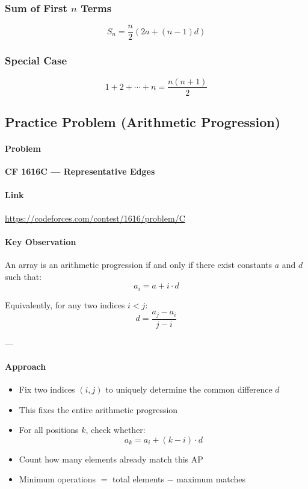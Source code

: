 \documentclass[11pt]{article}
\begin{document}
\subsubsection{Sum of First $n$ Terms}
\[
S_n = \frac{n}{2} (2a + (n-1)d)
\]

\subsubsection{Special Case}
\[
1 + 2 + \cdots + n = \frac{n(n+1)}{2}
\]

\subsection{Practice Problem (Arithmetic Progression)}

\paragraph{Problem}
\textbf{CF 1616C — Representative Edges}

\paragraph{Link}
\url{https://codeforces.com/contest/1616/problem/C}

\paragraph{Key Observation}
An array is an arithmetic progression if and only if there exist constants
$a$ and $d$ such that:
\[
a_i = a + i \cdot d
\]

Equivalently, for any two indices $i < j$:
\[
d = \frac{a_j - a_i}{j - i}
\]

---

\paragraph{Approach}
\begin{itemize}
    \item Fix two indices $(i, j)$ to uniquely determine the common difference $d$
    \item This fixes the entire arithmetic progression
    \item For all positions $k$, check whether:
    \[
    a_k = a_i + (k - i)\cdot d
    \]
    \item Count how many elements already match this AP
    \item Minimum operations $=$ total elements $-$ maximum matches
\end{itemize}
\end{document}
